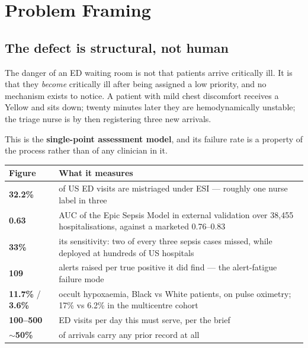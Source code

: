 \documentclass[10pt,a4paper,twocolumn]{article}
\begin{document}
\section{Problem Framing}
\label{sec:problem}

\subsection{The defect is structural, not human}
The danger of an ED waiting room is not that patients arrive critically ill. It is that they
\emph{become} critically ill after being assigned a low priority, and no mechanism exists to
notice. A patient with mild chest discomfort receives a Yellow and sits down; twenty minutes later
they are hemodynamically unstable; the triage nurse is by then registering three new arrivals.

This is the \textbf{single-point assessment model}, and its failure rate is a property of the
process rather than of any clinician in it.

\begin{center}\footnotesize\sffamily
\begin{tabular}{@{}p{1.35cm}p{6.45cm}@{}}
\toprule
\rowcolor{AccPurple!10}
\textbf{Figure} & \textbf{What it measures}\\
\midrule
\textbf{32.2\%} & of US ED visits are mistriaged under ESI --- roughly one nurse label in three\\
\addlinespace[2pt]
\textbf{0.63} & AUC of the Epic Sepsis Model in external validation over 38{,}455 hospitalisations, against a marketed 0.76--0.83\\
\addlinespace[2pt]
\textbf{33\%} & its sensitivity: two of every three sepsis cases missed, while deployed at hundreds of US hospitals\\
\addlinespace[2pt]
\textbf{109} & alerts raised per true positive it did find --- the alert-fatigue failure mode\\
\addlinespace[2pt]
\textbf{11.7\%} / \textbf{3.6\%} & occult hypoxaemia, Black vs White patients, on pulse oximetry; 17\% vs 6.2\% in the multicentre cohort\\
\addlinespace[2pt]
\textbf{100--500} & ED visits per day this must serve, per the brief\\
\addlinespace[2pt]
\textbf{$\sim$50\%} & of arrivals carry any prior record at all\\
\bottomrule
\end{tabular}
\end{center}
\end{document}
